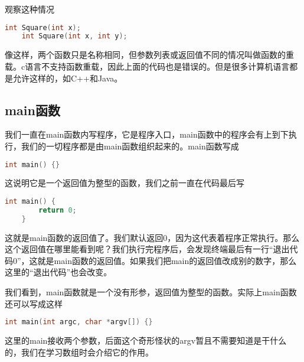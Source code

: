 观察这种情况

\begin{lstlisting}[language=C]
    int Square(int x);
    int Square(int x, int y);
\end{lstlisting}

像这样，两个函数只是名称相同，但参数列表或返回值不同的情况叫做函数的重载。c语言不支持函数重载，因此上面的代码也是错误的。但是很多计算机语言都是允许这样的，如C++和Java。

\subsection{main函数}

我们一直在main函数内写程序，它是程序入口，main函数中的程序会有上到下执行，我们的一切程序都是由main函数组织起来的。main函数写成

\begin{lstlisting}[language=C]
    int main() {}
\end{lstlisting}

这说明它是一个返回值为整型的函数，我们之前一直在代码最后写

\begin{lstlisting}[language=C]
    int main() {
        return 0;
    }
\end{lstlisting}

这就是main函数的返回值了。我们默认返回0，因为这代表着程序正常执行。那么这个返回值在哪里能看到呢？我们执行完程序后，会发现终端最后有一行“退出代码0”，这就是main函数的返回值。如果我们把main的返回值改成别的数字，那么这里的“退出代码”也会改变。

我们看到，main函数就是一个没有形参，返回值为整型的函数。实际上main函数还可以写成这样

\begin{lstlisting}[language=C]
    int main(int argc, char *argv[]) {}
\end{lstlisting}

这里的main接收两个参数，后面这个奇形怪状的argv暂且不需要知道是干什么的，我们在学习数组时会介绍它的作用。
